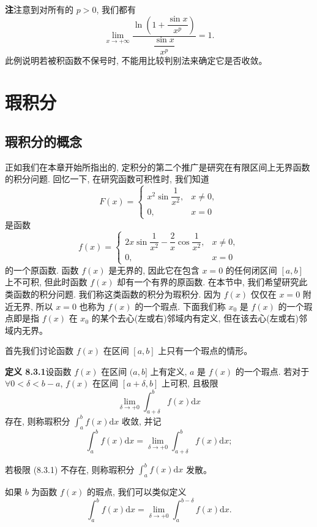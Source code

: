 \documentclass[UTF8,12pt,a4paper,fontset=fandol]{ctexart}
\begin{document}
\noindent\textbf{注}\quad 注意到对所有的 $p>0$, 我们都有
\[
  \lim_{x\to+\infty}
  \frac{\ln\left(1+\dfrac{\sin x}{x^p}\right)}{\dfrac{\sin x}{x^p}}
  =
  1.
\]
此例说明若被积函数不保号时, 不能用比较判别法来确定它是否收敛。

\section{瑕积分}

\subsection{瑕积分的概念}

正如我们在本章开始所指出的, 定积分的第二个推广是研究在有限区间上无界函数的积分问题. 回忆一下, 在研究函数可积性时, 我们知道
\[
  F(x)=
  \begin{cases}
    x^2\sin\dfrac1{x^2}, & x\ne0,\\
    0, & x=0
  \end{cases}
\]
是函数
\[
  f(x)=
  \begin{cases}
    2x\sin\dfrac1{x^2}-\dfrac2x\cos\dfrac1{x^2}, & x\ne0,\\
    0, & x=0
  \end{cases}
\]
的一个原函数. 函数 $f(x)$ 是无界的, 因此它在包含 $x=0$ 的任何闭区间 $[a,b]$ 上不可积, 但此时函数 $f(x)$ 却有一个有界的原函数. 在本节中, 我们希望研究此类函数的积分问题. 我们称这类函数的积分为瑕积分. 因为 $f(x)$ 仅仅在 $x=0$ 附近无界, 所以 $x=0$ 也称为 $f(x)$ 的一个瑕点. 下面我们称 $x_0$ 是 $f(x)$ 的一个瑕点即是指 $f(x)$ 在 $x_0$ 的某个去心(左或右)邻域内有定义, 但在该去心(左或右)邻域内无界。

首先我们讨论函数 $f(x)$ 在区间 $[a,b]$ 上只有一个瑕点的情形。

\noindent\textbf{定义 8.3.1}\quad 设函数 $f(x)$ 在区间 $(a,b]$ 上有定义, $a$ 是 $f(x)$ 的一个瑕点. 若对于 $\forall 0<\delta<b-a$, $f(x)$ 在区间 $[a+\delta,b]$ 上可积, 且极限
\begin{equation}
  \lim_{\delta\to+0}\int_{a+\delta}^b f(x)\mathrm dx
  \tag{8.3.1}
\end{equation}
存在, 则称瑕积分 $\int_a^b f(x)\mathrm dx$ 收敛, 并记
\[
  \int_a^b f(x)\mathrm dx
  =
  \lim_{\delta\to+0}\int_{a+\delta}^b f(x)\mathrm dx;
\]

若极限 (8.3.1) 不存在, 则称瑕积分 $\int_a^b f(x)\mathrm dx$ 发散。

如果 $b$ 为函数 $f(x)$ 的瑕点, 我们可以类似定义
\[
  \int_a^b f(x)\mathrm dx
  =
  \lim_{\delta\to+0}\int_a^{b-\delta}f(x)\mathrm dx.
\]
\end{document}
